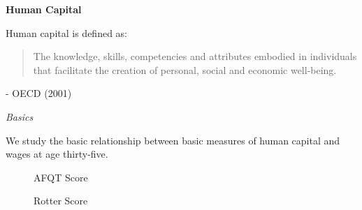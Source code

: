 \begin{frame}\begin{center}
    \LARGE\textbf{Human Capital}
\end{center}\end{frame}
\begin{frame}
Human capital is defined as:
\vspace{\baselineskip}

\begin{quote}
The knowledge, skills, competencies and attributes embodied in individuals that facilitate
the creation of personal, social and economic well-being.
\end{quote}\vspace{-0.5pt} \hspace{6cm} - OECD (2001)
\end{frame}
\begin{frame}\begin{center}
\LARGE\textit{Basics}
\end{center}\end{frame}
\begin{frame}
We study the basic relationship between basic measures of human capital and wages at age thirty-five.
\end{frame}
\begin{frame}\begin{figure}[htp]\centering
\caption{AFQT Score}
\end{figure}\end{frame}
\begin{frame}\begin{figure}[htp]\centering
\caption{Rotter Score}
\end{figure}\end{frame}
